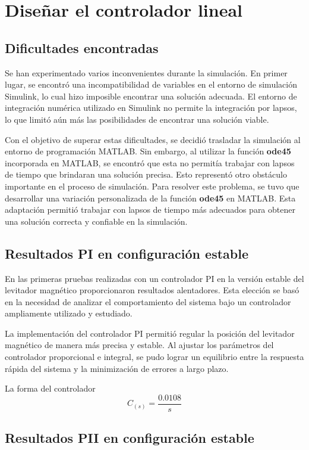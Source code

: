 \section{Diseñar el controlador lineal}
\subsection{Dificultades encontradas}

Se han experimentado varios inconvenientes durante la simulación. En primer lugar, se encontró una incompatibilidad de variables en el entorno de simulación Simulink, lo cual hizo imposible encontrar una solución adecuada. El entorno de integración numérica utilizado en Simulink no permite la integración por lapsos, lo que limitó aún más las posibilidades de encontrar una solución viable.

Con el objetivo de superar estas dificultades, se decidió trasladar la simulación al entorno de programación MATLAB. Sin embargo, al utilizar la función \textbf{ode45} incorporada en MATLAB, se encontró que esta no permitía trabajar con lapsos de tiempo que brindaran una solución precisa. Esto representó otro obstáculo importante en el proceso de simulación. Para resolver este problema, se tuvo que desarrollar una variación personalizada de la función \textbf{ode45}  en MATLAB. Esta adaptación permitió trabajar con lapsos de tiempo más adecuados para obtener una solución correcta y confiable en la simulación.


\subsection{Resultados PI en configuración estable}

En las primeras pruebas realizadas con un controlador PI en la versión estable del levitador magnético proporcionaron resultados alentadores. Esta elección se basó en la necesidad de analizar el comportamiento del sistema bajo un controlador ampliamente utilizado y estudiado.

La implementación del controlador PI permitió regular la posición del levitador magnético de manera más precisa y estable. Al ajustar los parámetros del controlador proporcional e integral, se pudo lograr un equilibrio entre la respuesta rápida del sistema y la minimización de errores a largo plazo.

La forma del controlador 
\[
C_{(s)} = \frac{0.0108}{s}
\]


\subsection{Resultados PII en configuración estable}

